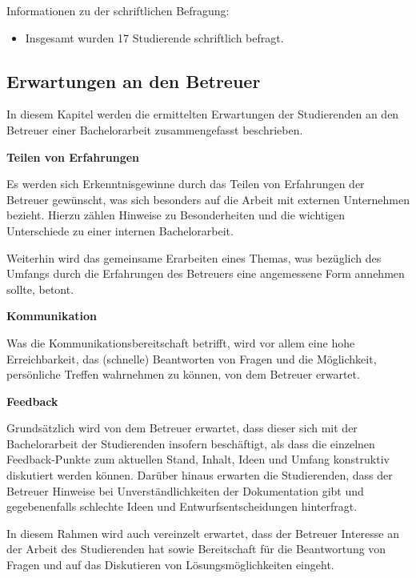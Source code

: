 \documentclass[bibliography=totoc,listof=totoc,BCOR=5mm,DIV=12,oneside]{scrbook}
\begin{document}
\label{sub:studentenchriftlichErgebnisse}
\par \bigskip Informationen zu der schriftlichen Befragung:
\begin{itemize}
\item Insgesamt wurden 17 Studierende schriftlich befragt.
\end{itemize}

\subsection{Erwartungen an den Betreuer}
\par In diesem Kapitel werden die ermittelten Erwartungen der Studierenden an den Betreuer einer Bachelorarbeit zusammengefasst beschrieben. 

\par \bigskip \textbf{Teilen von Erfahrungen}
\par Es werden sich Erkenntnisgewinne durch das Teilen von Erfahrungen der Betreuer gewünscht, was sich besonders auf die Arbeit mit externen Unternehmen bezieht. Hierzu zählen Hinweise zu Besonderheiten und die wichtigen Unterschiede zu einer internen Bachelorarbeit. 
\par Weiterhin wird das gemeinsame Erarbeiten eines Themas, was bezüglich des Umfangs durch die Erfahrungen des Betreuers eine angemessene Form annehmen sollte, betont.

\par \bigskip \textbf{Kommunikation}
\par Was die Kommunikationsbereitschaft betrifft, wird vor allem eine hohe Erreichbarkeit, das (schnelle) Beantworten von Fragen und die Möglichkeit, persönliche Treffen wahrnehmen zu können, von dem Betreuer erwartet.

\par \bigskip \textbf{Feedback}
\par Grundsätzlich wird von dem Betreuer erwartet, dass dieser sich mit der Bachelorarbeit der Studierenden insofern beschäftigt, als dass die einzelnen Feedback-Punkte zum aktuellen Stand, Inhalt, Ideen und Umfang konstruktiv diskutiert werden können. Darüber hinaus erwarten die Studierenden, dass der Betreuer Hinweise bei Unverständlichkeiten der Dokumentation gibt und gegebenenfalls schlechte Ideen und Entwurfsentscheidungen hinterfragt.
\par In diesem Rahmen wird auch vereinzelt erwartet, dass der Betreuer Interesse an der Arbeit des Studierenden hat sowie Bereitschaft für die Beantwortung von Fragen und auf das Diskutieren von Lösungsmöglichkeiten eingeht.
\end{document}
